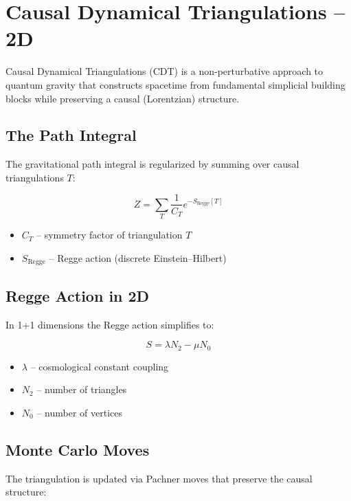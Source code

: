 \section{Causal Dynamical Triangulations -- 2D}

Causal Dynamical Triangulations (CDT) is a non-perturbative approach to quantum gravity that constructs spacetime from fundamental simplicial building blocks while preserving a causal (Lorentzian) structure.

\subsection{The Path Integral}

The gravitational path integral is regularized by summing over causal triangulations $T$:

\begin{equation}
Z = \sum_{T} \frac{1}{C_T} e^{-S_{\text{Regge}}[T]}
\end{equation}

\begin{itemize}
\item $C_T$ -- symmetry factor of triangulation $T$
\item $S_{\text{Regge}}$ -- Regge action (discrete Einstein--Hilbert)
\end{itemize}

\subsection{Regge Action in 2D}

In 1+1 dimensions the Regge action simplifies to:

\begin{equation}
S = \lambda N_2 - \mu N_0
\end{equation}

\begin{itemize}
\item $\lambda$ -- cosmological constant coupling
\item $N_2$ -- number of triangles
\item $N_0$ -- number of vertices
\end{itemize}

\subsection{Monte Carlo Moves}

The triangulation is updated via Pachner moves that preserve the causal structure:

